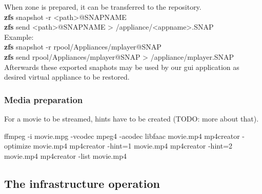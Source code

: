 \documentclass[11pt]{book}
\begin{document}
        


          When zone is prepared, it can be transferred to the repository. \\

          \textbf{zfs} snapshot -r <path>@SNAPNAME \\

          \textbf{zfs} send <path>@SNAPNAME > /appliance/<appname>.SNAP \\

          Example: \\
          \textbf{zfs} snapshot -r rpool/Appliances/mplayer@SNAP \\
          \textbf{zfs} send rpool/Appliances/mplayer@SNAP > /appliance/mplayer.SNAP \\


        Afterwards these exported snaphots may be used by our gui application as desired virtual appliance to be restored. 
        
      
        \subsubsection{Media preparation}
        \label{ssub:}

          For a movie to be streamed, hints have to be created (TODO: more about that).

          ffmpeg -i movie.mpg -vcodec mpeg4 -acodec libfaac movie.mp4
          mp4creator -optimize movie.mp4
          mp4creator -hint=1 movie.mp4
          mp4creator -hint=2 movie.mp4
          mp4creator -list movie.mp4

      
      \subsection{The infrastructure operation}
\end{document}
